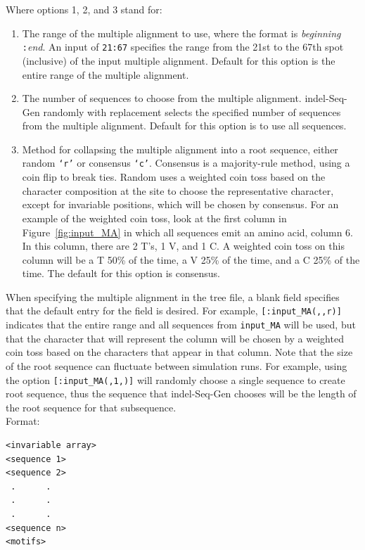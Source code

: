 \documentclass[10pt]{article}
\begin{document}
Where options 1, 2, and 3 stand for:
\begin{enumerate}
\item The range of the multiple alignment to use, where the format is {\it beginning}{\tt
:}{\it end}.  An input of {\tt 21:67} specifies the range from the 21st to the 67th spot
(inclusive) of the input multiple alignment.  Default for this option is the entire range of the multiple alignment.
\item The number of sequences to choose from the multiple alignment.  indel-Seq-Gen randomly with replacement selects the specified number of sequences from the multiple alignment. Default for this option is to use all sequences.
\item Method for collapsing the multiple alignment into a root sequence, either random
{\tt `r'} or consensus {\tt `c'}.  Consensus is a majority-rule method, using a coin flip to break ties.  Random uses a weighted coin toss based on the character composition at the site to choose the representative character, except for invariable positions, which will be chosen by consensus. For an example of the weighted coin toss, look at the first column in Figure~\ref{fig:input_MA} in which all sequences emit an amino acid, column 6.  In this
column, there are 2 T's, 1 V, and 1 C.  A weighted coin toss on this column will be a T 50\% of the time, a V 25\% of the time, and a C 25\% of the time. The default for this option is consensus.
\end{enumerate}

When specifying the multiple alignment in the tree file, a blank field specifies that the default entry for the field is desired.  For example, \verb+[:input_MA(,,r)]+ indicates that the entire range and all sequences from {\tt input\_MA} will be used, but that the character that will represent the column will be chosen by a weighted coin toss based on the characters that appear in that column.  Note that the size of the root sequence can fluctuate between simulation runs.  For example, using the option \verb+[:input_MA(,1,)]+ will randomly choose a single sequence to create root sequence, thus the sequence that
indel-Seq-Gen chooses will be the length of the root sequence for that subsequence.\\

Format:
\begin{verbatim}
<invariable array>
<sequence 1>
<sequence 2>
 .      .
 .      .
 .      .
<sequence n>
<motifs>
\end{verbatim}
\end{document}
